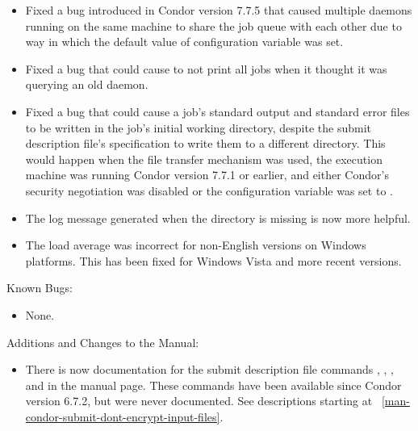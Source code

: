 \begin{itemize}
\item Fixed a bug introduced in Condor version 7.7.5 that caused multiple
 daemons running on the same machine to share the job queue
with each other due to way in which the default value of configuration
variable  was set.

\item Fixed a bug that could cause  to not print all jobs when
it thought it was querying an old  daemon.

\item Fixed a bug that could cause a job's standard output and standard
error files to be written in the job's initial working directory,
despite the submit description file's specification to write them 
to a different directory.
This would happen when the file transfer mechanism was used, 
the execution machine was running Condor version 7.7.1 or earlier, 
and either Condor's security negotiation
was disabled or the configuration variable
 was set to .

\item The log message generated when the  directory
is missing is now more helpful.

\item The load average was incorrect for non-English versions on 
Windows platforms.
This has been fixed for Windows Vista and more recent versions.

\end{itemize}

\noindent Known Bugs:

\begin{itemize}

\item None.

\end{itemize}

\noindent Additions and Changes to the Manual:

\begin{itemize}

\item There is now documentation for the submit description file commands
,
,
, and
 in the 
manual page.
These commands have been available since Condor version 6.7.2,
but were never documented.
See descriptions starting at
~\ref{man-condor-submit-dont-encrypt-input-files}.


\end{itemize}


